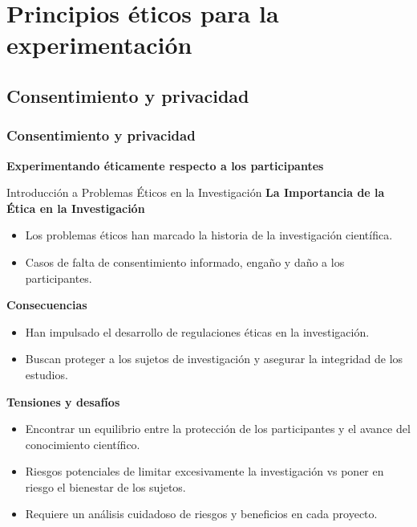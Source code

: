 ﻿\documentclass{beamer}
\begin{document}
\section{Principios éticos para la experimentación}

\subsection{Consentimiento y privacidad}
\begin{frame}
    \frametitle{Consentimiento y privacidad}
    \centering
    \textbf{\Large Experimentando éticamente respecto a los participantes}
    \vspace{0.5cm}
\end{frame}

\begin{frame}{Introducción a Problemas Éticos en la Investigación}
\textbf{La Importancia de la Ética en la Investigación}
\begin{itemize}
\item Los problemas éticos han marcado la historia de la investigación científica.
\item Casos de falta de consentimiento informado, engaño y daño a los participantes.
\end{itemize}
\textbf{Consecuencias}
\begin{itemize}
    \item Han impulsado el desarrollo de regulaciones éticas en la investigación.
    \item Buscan proteger a los sujetos de investigación y asegurar la integridad de los estudios.
\end{itemize}
\textbf{Tensiones y desafíos}
\begin{itemize}
    \item Encontrar un equilibrio entre la protección de los participantes y el avance del conocimiento científico.
    \item Riesgos potenciales de limitar excesivamente la investigación vs poner en riesgo el bienestar de los sujetos.
    \item Requiere un análisis cuidadoso de riesgos y beneficios en cada proyecto.
\end{itemize}
\end{frame}
\end{document}
